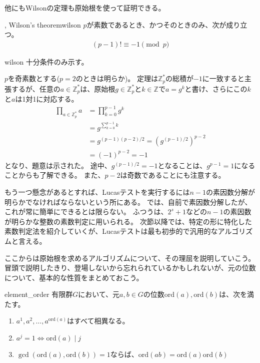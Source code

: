 他にもWilsonの定理も原始根を使って証明できる。

\begin{Theo}{, Wilson's theorem}{wilson}
$p$が素数であるとき、かつそのときのみ、次が成り立つ。
\begin{align*}
(p-1)! \equiv -1 \pmod{p}
\end{align*}
\end{Theo}

\begin{thProof}{wilson}
十分条件のみ示す。

$p$を奇素数とする($p=2$のときは明らか)。
定理は$\mathbb{Z}_p^*$の総積が$-1$に一致すると主張するが、任意の$a\in\mathbb{Z}_p^*$は、原始根$g\in\mathbb{Z}_p^*$と$k\in\mathbb{Z}$で$a=g^k$と書け、さらにこの$k$と$a$は1対1に対応する。
\begin{align*}
\prod_{a \in \mathbb{Z}_p^*} a &= \prod_{k=0}^{p-1} g^k\\
 &= g^{\sum_{k=0}^{p-1}k}\\
 &= g^{(p-1)(p-2)/2} = (g^{(p-1)/2})^{p-2}\\
 &= (-1)^{p-2} = -1
\end{align*}
となり、題意は示された。
途中、$g^{(p-1)/2}=-1$となることは、$g^{p-1}=1$になることからも了解できる。
また、$p-2$は奇数であることにも注意する。
\end{thProof}

もう一つ懸念があるとすれば、Lucasテストを実行するには$n-1$の素因数分解が明らかでなければならないという所にある。
では、自前で素因数分解したが、これが常に簡単にできるとは限らない。
ふつうは、$2^s+1$などの$n-1$の素因数が明らかな整数の素数判定に用いられる。
次節以降では、特定の形に特化した素数判定法を紹介していくが、Lucasテストは最も初歩的で汎用的なアルゴリズムと言える。

ここからは原始根を求めるアルゴリズムについて、その理屈を説明していこう。
冒頭で説明したきり、登場しないから忘れられているかもしれないが、元の位数について、基本的な性質をまとめておこう。

\begin{Prop}{}{element_order}
有限群$G$において、元$a,b\in G$の位数$\mbox{ord}(a), \mbox{ord}(b)$は、次を満たす。
\begin{enumerate}
\item $a^1,a^2,\ldots,a^{\mbox{ord}(a)}$はすべて相異なる。
\item $a^j=1 \iff \mbox{ord}(a) \mid j$
\item $\gcd(\mbox{ord}(a), \mbox{ord}(b))=1$ならば、$\mbox{ord}(ab)=\mbox{ord}(a)\mbox{ord}(b)$
\end{enumerate}
\end{Prop}

